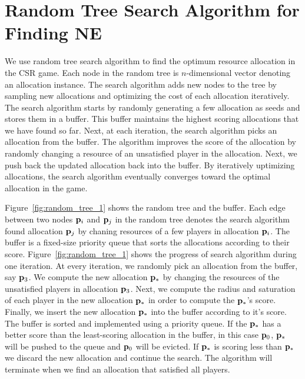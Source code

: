 \section{Random Tree Search Algorithm for Finding NE}\label{sec:apx-alg}
We use random tree search algorithm to find the optimum resource allocation in the CSR game.
Each node in the random tree is $n$-dimensional vector denoting an allocation instance.
The search algorithm adds new nodes to the tree by sampling new allocations and optimizing the cost of each allocation iteratively.
The search algorithm starts by randomly generating a few allocation as seeds and stores them in a buffer.
This buffer maintains the highest scoring allocations that we have found so far.
Next, at each iteration, the search algorithm picks an allocation from the buffer.
The algorithm improves the score of the allocation by randomly changing a resource of an unsatisfied player in the allocation. Next, we push back the updated allocation back into the buffer.
By iteratively uptimizing allocations, the search algorithm eventually converges toward the optimal allocation in the game.



Figure~\ref{fig:random_tree_1} shows the random tree and the buffer. Each edge between two nodes ${\bf p}_i$ and ${\bf p}_j$ in the random tree denotes the search algorithm found allocation ${\bf p}_j$ by chaning resources of a few players in allocation ${\bf p}_i$. The buffer is a fixed-size priority queue that sorts the allocations according to their score.
Figure~\ref{fig:random_tree_1} shows the progress of search algorithm during one iteration.
At every iteration, we randomly pick an allocation from the buffer, say ${\bf p}_3$. We compute the new allocation ${\bf p}_*$ by changing the resources of the unsatisfied players in allocation ${\bf p}_3$. Next, we compute the radius and saturation of each player in the new allocation ${\bf p}_*$ in order to compute the ${\bf p}_*$'s score. Finally, we insert the new allocation ${\bf p}_*$ into the buffer according to it's score. The buffer is sorted and implemented using a priority queue. If the ${\bf p}_*$ has a better score than the least-scoring allocation in the buffer, in this case ${\bf p}_0$, ${\bf p}_*$ will be pushed to the queue and ${\bf p}_0$ will be evicted. If ${\bf p}_*$ is scoring less than ${\bf p}_*$ we discard the new allocation and continue the search. The algorithm will terminate when we find an allocation that satisfied all players.

